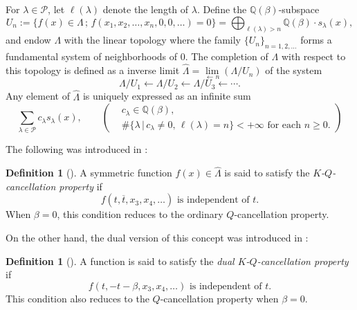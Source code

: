 \documentclass[dvipdfmx]{amsart}
\theoremstyle{definition}
\newtheorem{dfn}[thm]{Definition}
\theoremstyle{remark}
\def\QQ{\mathord{\mathbb{Q}}}
\begin{document}
For $\lambda\in \mathcal{P}$, let $\ell(\lambda)$ denote the length of $\lambda$.
Define the $\QQ(\beta)$-subspace
\[
U_n := \{ f(x) \in \Lambda \, ; \, f(x_1, x_2, \dots, x_n, 0, 0, \dots) = 0 \}
=\bigoplus_{\ell(\lambda)> n}\QQ(\beta)\cdot s_\lambda(x) ,
\]
and endow \( \Lambda \) with the linear topology where the family  \( \{ U_n \}_{n=1,2,\dots} \) forms a fundamental system of neighborhoods of $0$. The completion of \( \Lambda \) with respect to this topology is defined as a inverse limit
\( \widehat{\Lambda}=\lim\limits_{\longleftarrow n}(\Lambda/U_n) \) of the system
\[
\Lambda/U_1\leftarrow \Lambda/U_2\leftarrow \Lambda/U_3\leftarrow\cdots.
\]
%
Any element of \( \widehat{\Lambda} \) is uniquely expressed as an infinite sum
\begin{equation}\label{eq:elem_of_widehat_en}
\sum_{\lambda \in \mathcal{P}} c_\lambda s_\lambda(x), \qquad
\left(
\begin{aligned}
& c_\lambda \in \mathbb{Q}(\beta), \\
& \# \{\lambda\,|\,c_\lambda\neq 0,\,\ell(\lambda)=n\}<+\infty \text{ for each } n\geq 0.
\end{aligned}
\right)
\end{equation}

The following was introduced in \cite{IKEDA201322}:

\begin{dfn}[{\cite[Definition 1.1]{IKEDA201322}}]
A symmetric function \( f(x) \in \widehat{\Lambda} \) is said to satisfy the \textit{\( K \)-\( Q \)-cancellation property} if
\[
f(t, \overline{t}, x_3, x_4, \dots) \text{ is independent of } t.
\]
When \( \beta = 0 \), this condition reduces to the ordinary \( Q \)-cancellation property.
\end{dfn}

On the other hand, the dual version of this concept was introduced in \cite{iwao2022}:

\begin{dfn}[{\cite[\S 8]{iwao2022}}]
A function is said to satisfy the \textit{dual \( K \)-\( Q \)-cancellation property} if
\[
f(t, -t - \beta, x_3, x_4, \dots) \text{ is independent of } t.
\]
This condition also reduces to the \( Q \)-cancellation property when \( \beta = 0 \).
\end{dfn}
\end{document}
